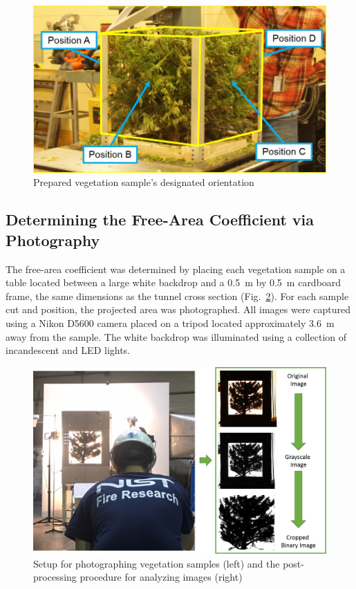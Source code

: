 \documentclass[12pt]{article}
\begin{document}
\begin{figure} [!]
	\centering 	\includegraphics[width=1.0\linewidth]{Picture3.jpg}
	\caption{Prepared vegetation sample's designated orientation}
	\label{fig:Vegpos}
\end{figure}

\subsection{Determining the Free-Area Coefficient via Photography}
\label{ssec:Free-Area Coef. Photo}

The free-area coefficient was determined by placing each vegetation sample on a table located between a large white backdrop and a 0.5~m by 0.5~m cardboard frame, the same dimensions as the tunnel cross section (Fig.~\ref{fig:ImgAnaly}). For each sample cut and position, the projected area was photographed. All images were captured using a Nikon D5600 camera placed on a tripod located approximately 3.6~\si{m} away from the sample. The white backdrop was illuminated using a collection of incandescent and LED lights.

\begin{figure} [!h]
	\centering 	\includegraphics[width=1.0\linewidth]{Picture5.jpg}
	\caption[Setup for photographing vegetation samples]{Setup for photographing vegetation samples (left) and the post-processing procedure for analyzing images (right)}
	\label{fig:ImgAnaly}
\end{figure}
\end{document}
